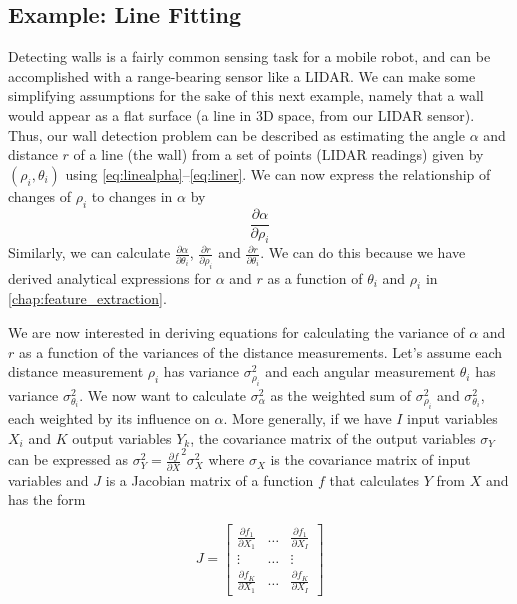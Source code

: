 \subsection{Example: Line Fitting}\label{sec:linefitting}
Detecting walls is a fairly common sensing task for a mobile robot, and can be accomplished with a range-bearing sensor like a LIDAR. We can make some simplifying assumptions for the sake of this next example, namely that a wall would appear as a flat surface (a line in 3D space, from our LIDAR sensor). Thus, our wall detection problem can be described as estimating the angle $\alpha$ and distance $r$ of a line (the wall) from a set of points (LIDAR readings) given by $(\rho_i,\theta_i)$ using \cref{eq:linealpha}--\ref{eq:liner}. We can now express the relationship of changes of $ \rho_i$ to changes in $ \alpha$ by
\begin{equation}
\frac{\partial \alpha}{\partial \rho_i}
\end{equation}
Similarly, we can calculate $ \frac{\partial \alpha}{\partial \theta_i}$, $ \frac{\partial r}{\partial \rho_i}$ and $ \frac{\partial r}{\partial \theta_i}$. We can do this because we have derived analytical expressions for $ \alpha$ and $ r$ as a function of $ \theta_i$ and $ \rho_i$ in \cref{chap:feature_extraction}.

We are now interested in deriving equations for calculating the variance of $ \alpha$ and $ r$ as a function of the variances of the distance measurements. Let's assume each distance measurement $ \rho_i$ has variance $ \sigma^2_{\rho_i}$ and each angular measurement $ \theta_i$ has variance $ \sigma^2_{\theta_i}$. We now want to calculate $ \sigma^2_{\alpha}$ as the weighted sum of  $ \sigma^2_{\rho_i}$ and $ \sigma^2_{\theta_i}$, each weighted by its influence on $ \alpha$.
More generally, if we have $ I$ input variables $ X_i$ and $K$ output variables $Y_k$, the covariance matrix of the output variables $ \sigma_Y$ can be expressed as $\sigma_Y^2=\frac{\partial f}{\partial X}^2 \sigma_X^2$ where $\sigma_X$ is the covariance matrix of input variables and $J$ is a Jacobian matrix of a function $ f$ that calculates $Y$ from $X$ and has the form

\begin{equation}
J=\left[
\begin{array}{ccc}
  \frac{\partial f_1}{\partial X_1} & \ldots & \frac{\partial f_1}{\partial X_I}\\
  \vdots & \ldots & \vdots\\
  \frac{\partial f_K}{\partial X_1} & \ldots & \frac{\partial f_K}{\partial X_I}
 \end{array}
 \right]
\end{equation}

